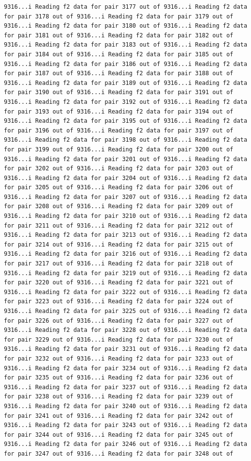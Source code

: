 \documentclass[
]{article}
\begin{document}
\begin{verbatim}
9316...i Reading f2 data for pair 3177 out of 9316...i Reading f2 data for pair 3178 out of 9316...i Reading f2 data for pair 3179 out of 9316...i Reading f2 data for pair 3180 out of 9316...i Reading f2 data for pair 3181 out of 9316...i Reading f2 data for pair 3182 out of 9316...i Reading f2 data for pair 3183 out of 9316...i Reading f2 data for pair 3184 out of 9316...i Reading f2 data for pair 3185 out of 9316...i Reading f2 data for pair 3186 out of 9316...i Reading f2 data for pair 3187 out of 9316...i Reading f2 data for pair 3188 out of 9316...i Reading f2 data for pair 3189 out of 9316...i Reading f2 data for pair 3190 out of 9316...i Reading f2 data for pair 3191 out of 9316...i Reading f2 data for pair 3192 out of 9316...i Reading f2 data for pair 3193 out of 9316...i Reading f2 data for pair 3194 out of 9316...i Reading f2 data for pair 3195 out of 9316...i Reading f2 data for pair 3196 out of 9316...i Reading f2 data for pair 3197 out of 9316...i Reading f2 data for pair 3198 out of 9316...i Reading f2 data for pair 3199 out of 9316...i Reading f2 data for pair 3200 out of 9316...i Reading f2 data for pair 3201 out of 9316...i Reading f2 data for pair 3202 out of 9316...i Reading f2 data for pair 3203 out of 9316...i Reading f2 data for pair 3204 out of 9316...i Reading f2 data for pair 3205 out of 9316...i Reading f2 data for pair 3206 out of 9316...i Reading f2 data for pair 3207 out of 9316...i Reading f2 data for pair 3208 out of 9316...i Reading f2 data for pair 3209 out of 9316...i Reading f2 data for pair 3210 out of 9316...i Reading f2 data for pair 3211 out of 9316...i Reading f2 data for pair 3212 out of 9316...i Reading f2 data for pair 3213 out of 9316...i Reading f2 data for pair 3214 out of 9316...i Reading f2 data for pair 3215 out of 9316...i Reading f2 data for pair 3216 out of 9316...i Reading f2 data for pair 3217 out of 9316...i Reading f2 data for pair 3218 out of 9316...i Reading f2 data for pair 3219 out of 9316...i Reading f2 data for pair 3220 out of 9316...i Reading f2 data for pair 3221 out of 9316...i Reading f2 data for pair 3222 out of 9316...i Reading f2 data for pair 3223 out of 9316...i Reading f2 data for pair 3224 out of 9316...i Reading f2 data for pair 3225 out of 9316...i Reading f2 data for pair 3226 out of 9316...i Reading f2 data for pair 3227 out of 9316...i Reading f2 data for pair 3228 out of 9316...i Reading f2 data for pair 3229 out of 9316...i Reading f2 data for pair 3230 out of 9316...i Reading f2 data for pair 3231 out of 9316...i Reading f2 data for pair 3232 out of 9316...i Reading f2 data for pair 3233 out of 9316...i Reading f2 data for pair 3234 out of 9316...i Reading f2 data for pair 3235 out of 9316...i Reading f2 data for pair 3236 out of 9316...i Reading f2 data for pair 3237 out of 9316...i Reading f2 data for pair 3238 out of 9316...i Reading f2 data for pair 3239 out of 9316...i Reading f2 data for pair 3240 out of 9316...i Reading f2 data for pair 3241 out of 9316...i Reading f2 data for pair 3242 out of 9316...i Reading f2 data for pair 3243 out of 9316...i Reading f2 data for pair 3244 out of 9316...i Reading f2 data for pair 3245 out of 9316...i Reading f2 data for pair 3246 out of 9316...i Reading f2 data for pair 3247 out of 9316...i Reading f2 data for pair 3248 out of 
\end{verbatim}
\end{document}
